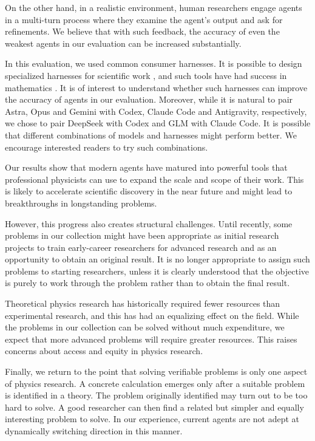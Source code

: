 \documentclass[aps,prd,reprint,superscriptaddress,nofootinbib]{revtex4-2}
\begin{document}
On the other hand, in a realistic environment, human researchers engage agents in a multi-turn process where they examine the agent's output and ask for refinements. We believe that with such feedback, the accuracy of even the weakest agents in our evaluation can be increased substantially. 

In this evaluation, we used common consumer harnesses. It is possible to design specialized harnesses for scientific work \cite{morgensztern2026solveragent,schwartz2026bootloops,anthropic2026claudescience,gottweis2025aicoscientist,lu2026automationairesearch}, and such tools have had success in mathematics \cite{schmitt2026proofcouncil,tsoukalas2026alphaproofnexus}. It is of interest to understand whether such harnesses can improve the accuracy of agents in our evaluation. Moreover, while it is natural to pair Astra, Opus and Gemini with Codex, Claude Code and Antigravity, respectively, we chose to pair DeepSeek with Codex and GLM with Claude Code. It is possible that different combinations of models and harnesses might perform better.  We encourage interested readers to try such combinations.



Our results show that modern agents have matured into powerful tools that professional physicists can use to expand the scale and scope of their work. This is likely to accelerate scientific discovery in the near future and might lead to breakthroughs in longstanding problems.

However, this progress also creates structural challenges. Until recently, some problems in our collection might have been appropriate as initial research projects to train early-career researchers for advanced research and as an opportunity to obtain an original result. It is no longer appropriate to assign such problems to starting researchers, unless it is clearly understood that the objective is purely to work through the problem rather than to obtain the final result. 





Theoretical physics research has historically required fewer resources than experimental research, and this has had an equalizing effect on the field. While the problems in our collection can be solved without much expenditure, we expect that more advanced problems will require greater resources. This raises concerns about access and equity in physics research. 

Finally, we return to the point that solving verifiable problems is only one aspect of physics research.  A concrete calculation emerges only after a suitable problem is identified in a theory. The problem originally identified may turn out to be too hard to solve.  A good researcher can then find a related but simpler and equally interesting problem to solve.  In our experience, current agents are not adept at dynamically switching direction in this manner. 
\end{document}
